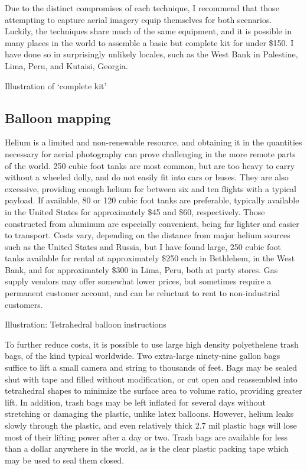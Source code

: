 \documentclass[11pt]{report}
\begin{document}
Due to the distinct compromises of each technique, I recommend that those attempting to capture aerial imagery equip themselves for both scenarios. Luckily, the techniques share much of the same equipment, and it is possible in many places in the world to assemble a basic but complete kit for under \$150. I have done so in surprisingly unlikely locales, such as the West Bank in Palestine, Lima, Peru, and Kutaisi, Georgia. 

Illustration of `complete kit'

\subsection{Balloon mapping}

Helium is a limited and non-renewable resource, and obtaining it in the quantities necessary for aerial photography can prove challenging in the more remote parts of the world. 250 cubic foot tanks are most common, but are too heavy to carry without a wheeled dolly, and do not easily fit into cars or buses. They are also excessive, providing enough helium for between six and ten flights with a typical payload. If available, 80 or 120 cubic foot tanks are preferable, typically available in the United States for approximately \$45 and \$60, respectively. Those constructed from aluminum are especially convenient, being far lighter and easier to transport. Costs vary, depending on the distance from major helium sources such as the United States and Russia, but I have found large, 250 cubic foot tanks available for rental at approximately \$250 each in Bethlehem, in the West Bank, and for approximately \$300 in Lima, Peru, both at party stores. Gas supply vendors may offer somewhat lower prices, but sometimes require a permanent customer account, and can be reluctant to rent to non-industrial customers. 

Illustration: Tetrahedral balloon instructions

To further reduce costs, it is possible to use large high density polyethelene trash bags, of the kind typical worldwide. Two extra-large ninety-nine gallon bags suffice to lift a small camera and string to thousands of feet. Bags may be sealed shut with tape and filled without modification, or cut open and reassembled into tetrahedral shapes to minimize the surface area to volume ratio, providing greater lift. In addition, trash bags may be left inflated for several days without stretching or damaging the plastic, unlike latex balloons. However, helium leaks slowly through the plastic, and even relatively thick 2.7 mil plastic bags will lose most of their lifting power after a day or two. Trash bags are available for less than a dollar anywhere in the world, as is the clear plastic packing tape which may be used to seal them closed.  
\end{document}
